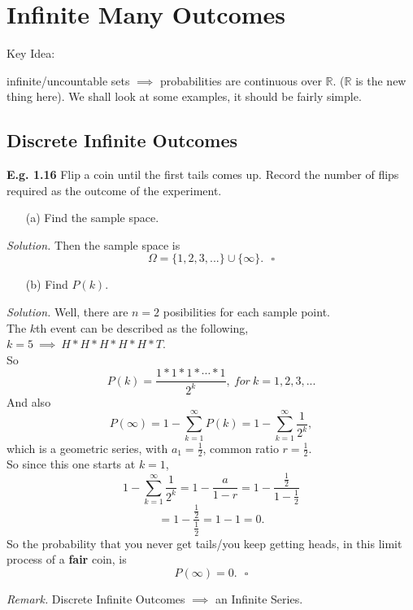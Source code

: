 \documentclass[12pt]{book}
\begin{document}
\section{Infinite Many Outcomes}
\hypertarget{infinitely many outcomes}{Key Idea:} infinite/uncountable sets $\implies{}$ probabilities are continuous over $\mathbb{R}$. ($\mathbb{R}$ is the new thing here). We shall look at some examples, it should be fairly simple.\\

\subsection{Discrete Infinite Outcomes}
\noindent \textbf{E.g. 1.16} Flip a coin until the first tails comes up. Record the number of flips required as the outcome of the experiment.\\
\begin{itemize} \item[(a)] Find the sample space.\end{itemize}
\textit{Solution.}
Then the sample space is  $$\Omega = \{1,2,3,...\}\cup \{\infty\}.~~~\square$$
\begin{itemize} \item[(b)] Find $P(k)$.\end{itemize}
\textit{Solution.}
Well, there are $n=2$ posibilities for each sample point.\\
The $k$th event can be described as the following,\\
$k=5 ~\implies~H*H*H*H*H*T.$\\
So $$P(k) = \frac{1*1*1*\cdots *1}{2^k}, ~for~k=1,2,3,...$$
And also 
$$P(\infty) = 1- \sum\limits_{k=1}^{\infty} P(k)= 1- \sum\limits_{k=1}^{\infty} \frac{1}{2^k},$$
which is a geometric series, with $a_1 = \frac{1}{2}$, common ratio $r=\frac{1}{2}$.\\
So since this one starts at $k=1$, 
$$1- \sum\limits_{k=1}^{\infty} \frac{1}{2^k} = 1-\frac{a}{1-r} = 1-\frac{\frac{1}{2}}{1-\frac{1}{2}}$$
$$=1-\frac{\frac{1}{2}}{\frac{1}{2}}=1-1 = 0.$$
So the probability that you never get tails/you keep getting heads, in this limit process of a \textbf{fair} coin, is 
$$P(\infty) = 0.~~~\square$$

\noindent \textit{Remark.} Discrete Infinite Outcomes $\implies{}$ an Infinite Series.
\end{document}
